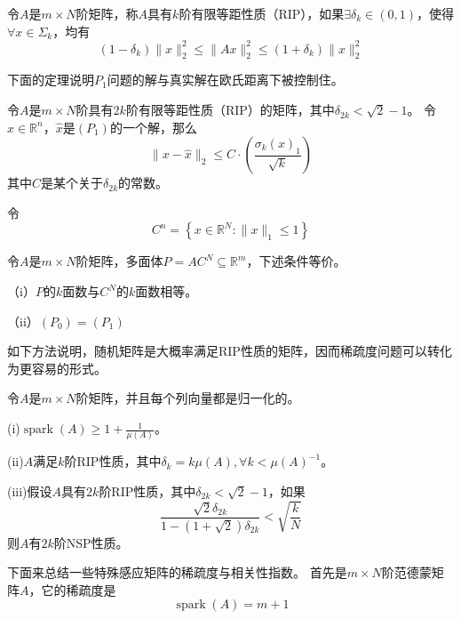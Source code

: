 \begin{definition}
    令$A$是$m\times N$阶矩阵，称$A$具有$k$阶有限等距性质（RIP），如果$\exists \delta_k
    \in (0,1)$，使得$\forall x \in \Sigma_k$，均有
    \begin{equation}
        \left(1-\delta_k\right)\|x\|_2^2 \leq\|A x\|_2^2 \leq\left(1+\delta_k\right)\|x\|_2^2
    \end{equation}
\end{definition}
下面的定理说明$P_1$问题的解与真实解在欧氏距离下被控制住。
\begin{theorem}
    令$A$是$m\times N$阶具有$2k$阶有限等距性质（RIP）的矩阵，其中$\delta_{2 k}<\sqrt{2} -1$。
    令$x \in \mathbb{R}^n$，$\hat{x}$是$(P_1)$的一个解，那么
    \begin{equation}
        \|x-\hat{x}\|_2 \leq C \cdot\left(\frac{\sigma_k(x)_1}{\sqrt{k}}\right)
    \end{equation}
    其中$C$是某个关于$\delta_{2 k}$的常数。
\end{theorem}
令
\begin{equation}
    C^n=\left\{x \in \mathbb{R}^N:\|x\|_1 \leq 1\right\}
\end{equation}
\begin{theorem}
    令$A$是$m\times N$阶矩阵，多面体$P=A C^N \subseteq \mathbb{R}^m$，下述条件等价。\par
    （i）$P$的$k$面数与$C^N$的$k$面数相等。\par
    （ii）$(P_0)=(P_1)$
\end{theorem}
如下方法说明，随机矩阵是大概率满足RIP性质的矩阵，因而稀疏度问题可以转化为更容易的形式。
\begin{theorem}
    令$A$是$m\times N$阶矩阵，并且每个列向量都是归一化的。\par
    (i)$\operatorname{spark}(A) \geq 1+\frac{1}{\mu(A)}$。\par
    (ii)$A$满足$k$阶RIP性质，其中$\delta_k=k \mu(A),\forall  k<\mu(A)^{-1}$。\par
    (iii)假设$A$具有$2k$阶RIP性质，其中$\delta_{2 k}<\sqrt{2} -1$，如果
    \begin{equation}
        \frac{\sqrt{2} \delta_{2 k}}{1-(1+\sqrt{2}) \delta_{2 k}}<\sqrt{\frac{k}{N}}
    \end{equation}
    则$A$有$2k$阶NSP性质。
\end{theorem}
下面来总结一些特殊感应矩阵的稀疏度与相关性指数。
首先是$m\times N$阶范德蒙矩阵$A$，它的稀疏度是
\begin{equation}
    \operatorname{spark}(A)=m+1
\end{equation}
